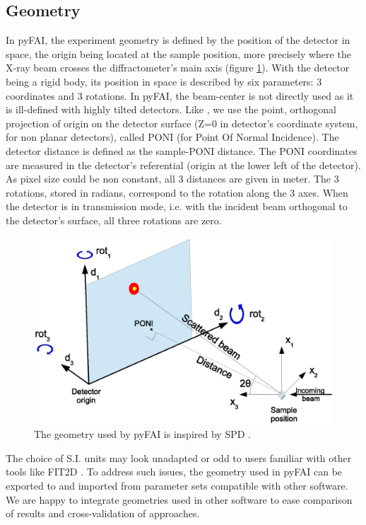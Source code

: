 \documentclass[preprint]{iucr}
\begin{document}
\subsection{Geometry}
In pyFAI, the experiment geometry is defined by the position of the detector in
space, the origin being located at the sample position, more precisely where the
X-ray beam crosses the diffractometer's main axis (figure \ref{PONI}).
With the detector being a rigid body, its position in space is described by
six parameters: 3 coordinates and 3 rotations.
In pyFAI, the beam-center is not directly used as it is ill-defined with
highly tilted detectors.
Like \cite{spd}, we use the point, orthogonal projection of origin on
the detector surface (Z=0 in detector's coordinate system, for non planar detectors),
called PONI (for Point Of Normal Incidence).
The detector distance is defined as the sample-PONI distance.
The PONI coordinates are measured in the detector's referential (origin at the lower
left of the detector).
As pixel size could be non constant, all 3 distances are given in meter.
The 3 rotations, stored in radians, correspond to the rotation along the 3
axes.
When the detector is in transmission mode, i.e. with the
incident beam orthogonal to the detector's surface, all three rotations are
zero.


\begin{figure}
\label{PONI}
\begin{center}
\includegraphics[width=15cm]{PONI.eps}
\caption{The geometry used by pyFAI is inspired by SPD \cite{spd}.}
\end{center}
\end{figure}

The choice of S.I. units may look unadapted or odd to users familiar with
other tools like FIT2D \cite{fit2d}. To address such issues, the geometry used in pyFAI can be
exported to and imported from parameter sets compatible with other software.
We are happy to integrate geometries used in other software to ease
comparison of results and cross-validation of approaches.
\end{document}
